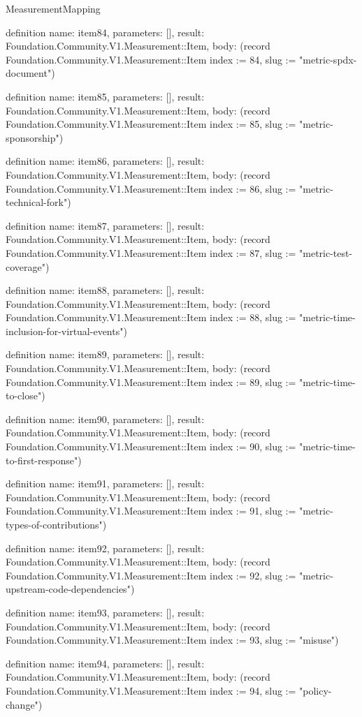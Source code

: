 \begin{lexlean}{MeasurementMapping}
\begin{semanticmodule}
definition{
  name: item84,
  parameters: [],
  result: Foundation.Community.V1.Measurement::Item,
  body: (record Foundation.Community.V1.Measurement::Item {index := 84, slug := "metric-spdx-document"})
}

definition{
  name: item85,
  parameters: [],
  result: Foundation.Community.V1.Measurement::Item,
  body: (record Foundation.Community.V1.Measurement::Item {index := 85, slug := "metric-sponsorship"})
}

definition{
  name: item86,
  parameters: [],
  result: Foundation.Community.V1.Measurement::Item,
  body: (record Foundation.Community.V1.Measurement::Item {index := 86, slug := "metric-technical-fork"})
}

definition{
  name: item87,
  parameters: [],
  result: Foundation.Community.V1.Measurement::Item,
  body: (record Foundation.Community.V1.Measurement::Item {index := 87, slug := "metric-test-coverage"})
}

definition{
  name: item88,
  parameters: [],
  result: Foundation.Community.V1.Measurement::Item,
  body: (record Foundation.Community.V1.Measurement::Item {index := 88, slug := "metric-time-inclusion-for-virtual-events"})
}

definition{
  name: item89,
  parameters: [],
  result: Foundation.Community.V1.Measurement::Item,
  body: (record Foundation.Community.V1.Measurement::Item {index := 89, slug := "metric-time-to-close"})
}

definition{
  name: item90,
  parameters: [],
  result: Foundation.Community.V1.Measurement::Item,
  body: (record Foundation.Community.V1.Measurement::Item {index := 90, slug := "metric-time-to-first-response"})
}

definition{
  name: item91,
  parameters: [],
  result: Foundation.Community.V1.Measurement::Item,
  body: (record Foundation.Community.V1.Measurement::Item {index := 91, slug := "metric-types-of-contributions"})
}

definition{
  name: item92,
  parameters: [],
  result: Foundation.Community.V1.Measurement::Item,
  body: (record Foundation.Community.V1.Measurement::Item {index := 92, slug := "metric-upstream-code-dependencies"})
}

definition{
  name: item93,
  parameters: [],
  result: Foundation.Community.V1.Measurement::Item,
  body: (record Foundation.Community.V1.Measurement::Item {index := 93, slug := "misuse"})
}

definition{
  name: item94,
  parameters: [],
  result: Foundation.Community.V1.Measurement::Item,
  body: (record Foundation.Community.V1.Measurement::Item {index := 94, slug := "policy-change"})
}


\end{semanticmodule}
\end{lexlean}
